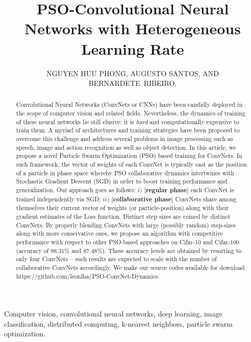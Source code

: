 \documentclass{ieeeaccess}
\begin{document}

\title{PSO-Convolutional Neural Networks with Heterogeneous Learning Rate}
\author{
\uppercase{Nguyen Huu Phong},
\uppercase{Augusto Santos, and Bernardete~Ribeiro},}
\address[1,2,3]{CISUC, Department of Informatics Engineering, University of Coimbra, Coimbra Portugal}




\begin{abstract}
 Convolutional Neural Networks (ConvNets or CNNs) have been candidly deployed in the scope of computer vision and related fields. Nevertheless, the dynamics of training of these neural networks lie still elusive: it is \emph{hard} and computationally expensive to train them. A myriad of architectures and training strategies have been proposed to overcome this challenge and address several problems in image processing such as speech, image and action recognition as well as object detection. In this article, we propose a novel Particle Swarm Optimization (PSO) based training for ConvNets. In such framework, the vector of weights of each ConvNet is typically cast as the position of a particle in phase space whereby PSO collaborative dynamics intertwines with Stochastic Gradient Descent (SGD) in order to boost training performance and generalization. Our approach goes as follows: $i)$ [\textbf{regular phase}] each ConvNet is trained independently via SGD; $ii)$ [\textbf{collaborative phase}] ConvNets share among themselves their current vector of weights (or particle-position) along with their gradient estimates of the Loss function. Distinct step sizes are coined by distinct ConvNets. By properly blending ConvNets with large (possibly random) step-sizes along with more conservative ones, we propose an algorithm with competitive performance with respect to other PSO-based approaches on Cifar-10 and Cifar-100 (accuracy of $98.31\%$ and $87.48\%$). These accuracy levels are obtained by resorting to only four ConvNets -- such results are expected to scale with the number of collaborative ConvNets accordingly. We make our source codes available for download https://github.com/leonlha/PSO-ConvNet-Dynamics.
\end{abstract}
\begin{IEEEkeywords}
Computer vision, convolutional neural networks, deep learning, image classification, distributed computing, k-nearest neighbors, particle swarm optimization.
\end{IEEEkeywords}
\titlepgskip=-15pt
\maketitle
\end{document}
